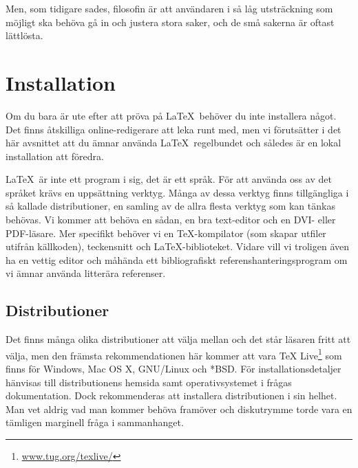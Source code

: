Men, som tidigare sades, filosofin är att användaren i så låg utsträckning som möjligt ska behöva gå in och justera stora saker, och de små sakerna är oftast lättlösta.

\section{Installation}
Om du bara är ute efter att pröva på \LaTeX\ behöver du inte installera något. Det finns åtskilliga online-redigerare att leka runt med, men vi förutsätter i det här avsnittet att du ämnar använda \LaTeX\ regelbundet och således är en lokal installation att föredra.

\LaTeX\ är inte ett program i sig, det är ett språk. För att använda oss av det språket krävs en uppsättning verktyg. Många av dessa verktyg finns tillgängliga i så kallade distributioner, en samling av de allra flesta verktyg som kan tänkas behövas. Vi kommer att behöva en sådan, en bra text-editor och en DVI- eller PDF-läsare. Mer specifikt behöver vi en \TeX-kompilator (som skapar utfiler utifrån källkoden), teckensnitt och \LaTeX-biblioteket. Vidare vill vi troligen även ha en vettig editor och måhända ett bibliografiskt referenshanteringsprogram om vi ämnar använda litterära referenser.

\subsection{Distributioner}
Det finns många olika distributioner att välja mellan och det står läsaren fritt att välja, men den främsta rekommendationen här kommer att vara TeX Live\footnote{\url{www.tug.org/texlive/}} som finns för Windows, Mac OS X, GNU/Linux och *BSD. För installationsdetaljer hänvisas till distributionens hemsida samt operativsystemet i frågas dokumentation. Dock rekommenderas att installera distributionen i sin helhet. Man vet aldrig vad man kommer behöva framöver och diskutrymme torde vara en tämligen marginell fråga i sammanhanget.

